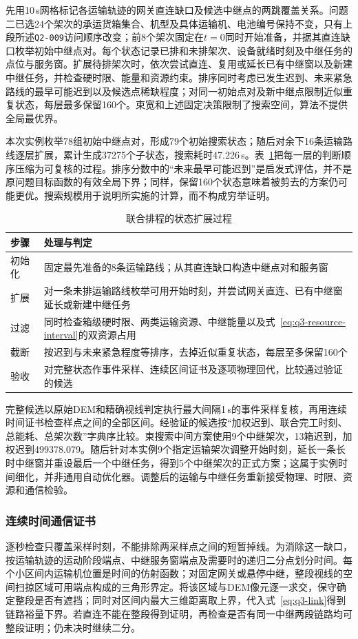 \documentclass[bwprint,fontset=fandol]{gmcmthesis}
\begin{document}
先用10\,s网格标记各运输轨迹的网关直连缺口及候选中继点的两跳覆盖关系。问题二已选24个架次的承运货箱集合、机型及具体运输机、电池编号保持不变，只有上段所述\texttt{Q2-009}访问顺序改变；前8个架次固定在$t=0$同时开始准备，并据其直连缺口枚举初始中继点对。每个状态记录已排和未排架次、设备就绪时刻及中继任务的点位与服务窗。扩展待排架次时，依次尝试直连、复用或延长已有中继窗以及新建中继任务，并检查硬时限、能量和资源约束。排序同时考虑已发生迟到、未来紧急路线的最早可能迟到以及候选点稀缺程度；对同一初始点对及新中继点限制近似重复状态，每层最多保留160个。束宽和上述固定决策限制了搜索空间，算法不提供全局最优界。

本次实例枚举78组初始中继点对，形成79个初始搜索状态；随后对余下16条运输路线逐层扩展，累计生成37275个子状态，搜索耗时47.226\,s。表~\ref{tab:q3-search-flow}把每一层的判断顺序压缩为可复核的过程。排序分数中的“未来最早可能迟到”是启发式评估，并不是原问题目标函数的有效全局下界；同样，保留160个状态意味着被剪去的方案仍可能更优。搜索规模用于说明所实施的计算，而不构成穷举证明。
\begin{table}[htbp]
\centering\small
\caption{联合排程的状态扩展过程}
\label{tab:q3-search-flow}
\begin{tabular}{@{}p{}p{}@{}}
\toprule
步骤 & 处理与判定\\
\midrule
初始化 & 固定最先准备的8条运输路线；从其直连缺口构造中继点对和服务窗\\
扩展 & 对一条未排运输路线枚举可用开始时刻，并尝试网关直连、已有中继窗延长或新建中继任务\\
过滤 & 同时检查箱级硬时限、两类运输资源、中继能量以及式~\eqref{eq:q3-resource-interval}的双资源占用\\
截断 & 按迟到与未来紧急程度等排序，去掉近似重复状态，每层至多保留160个\\
验收 & 对完整状态作事件采样、连续区间证书及逐项物理回代，比较通过验证的候选\\
\bottomrule
\end{tabular}
\end{table}

完整候选以原始DEM和精确视线判定执行最大间隔1\,s的事件采样复核，再用连续时间证书检查样点之间的全部区间。经验证的候选按“加权迟到、联合完工时刻、总能耗、总架次数”字典序比较。束搜索中间方案使用9个中继架次，13箱迟到，加权迟到499378.079。随后针对本实例9个指定运输架次调整开始时刻，延长一条长时中继窗并重设最后一个中继任务，得到5个中继架次的正式方案；这属于实例时间细化，并非通用自动优化器。调整后的运输与中继任务重新接受物理、时限、资源和通信检验。

\subsubsection{连续时间通信证书}
逐秒检查只覆盖采样时刻，不能排除两采样点之间的短暂掉线。为消除这一缺口，按运输轨迹的运动阶段端点、中继服务窗端点及需要时的递归二分点划分时间。每个小区间内运输机位置是时间的仿射函数；对固定网关或悬停中继，整段视线的空间扫掠区域可用端点构成的三角形界定。将该区域与DEM像元逐一求交，保守确定整段是否有遮挡；同时对区间内最大三维距离取上界，代入式~\eqref{eq:q3-link}得到链路裕量下界。若直连不能在整段得到证明，再检查是否有同一中继两段链路均可整段证明；仍未决时继续二分。
\end{document}
